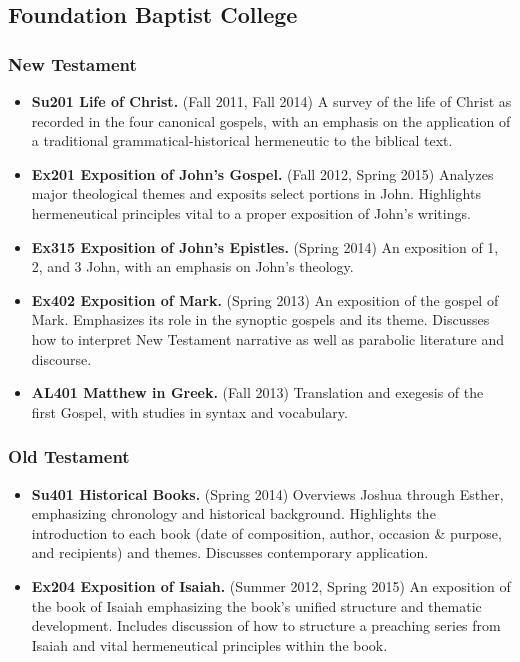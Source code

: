 \subsection{Foundation Baptist College}\label{foundation-baptist-college}

\subsubsection{New Testament}\label{new-testament}

\begin{itemize}
\itemsep1pt\parskip0pt
\item
  \textbf{Su201 Life of Christ.} (Fall 2011, Fall 2014) A survey of the life of Christ as recorded in the four canonical gospels, with an emphasis on the application of a traditional grammatical-historical hermeneutic to the biblical text.
\item
  \textbf{Ex201 Exposition of John's Gospel.} (Fall 2012, Spring 2015) Analyzes major theological themes and exposits select portions in John. Highlights hermeneutical principles vital to a proper exposition of John's writings.
\item
  \textbf{Ex315 Exposition of John's Epistles.} (Spring 2014) An exposition of 1, 2, and 3 John, with an emphasis on John's theology.
\item
  \textbf{Ex402 Exposition of Mark.} (Spring 2013) An exposition of the gospel of Mark. Emphasizes its role in the synoptic gospels and its theme. Discusses how to interpret New Testament narrative as well as parabolic literature and discourse.
\item
  \textbf{AL401 Matthew in Greek.} (Fall 2013) Translation and exegesis of the first Gospel, with studies in syntax and vocabulary.
\end{itemize}

\subsubsection{Old Testament}\label{old-testament}

\begin{itemize}
\itemsep1pt\parskip0pt
\item
  \textbf{Su401 Historical Books.} (Spring 2014) Overviews Joshua through Esther, emphasizing chronology and historical background. Highlights the introduction to each book (date of composition, author, occasion \& purpose, and recipients) and themes. Discusses contemporary application.
\item
  \textbf{Ex204 Exposition of Isaiah.} (Summer 2012, Spring 2015) An exposition of the book of Isaiah emphasizing the book's unified structure and thematic development. Includes discussion of how to structure a preaching series from Isaiah and vital hermeneutical principles within the book.
\end{itemize}

